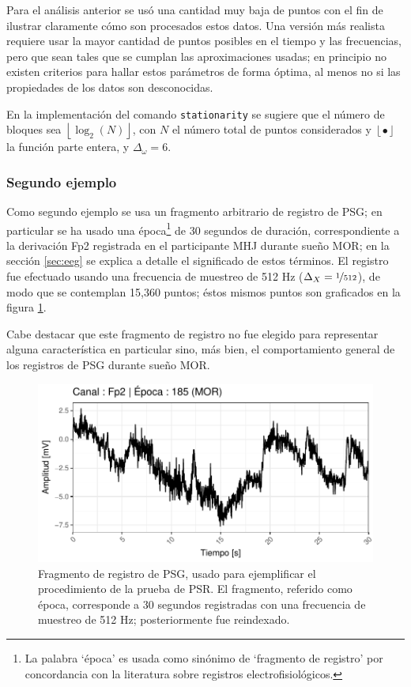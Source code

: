 \documentclass[12pt,letterpaper]{book}
\newcommand{\entero}[1]{\left\lfloor #1 \right\rfloor}
\begin{document}
Para el análisis anterior se usó una cantidad muy baja de puntos con el fin de ilustrar claramente cómo son procesados estos datos.
%
Una versión más realista requiere usar la mayor cantidad de puntos posibles en el tiempo y las frecuencias, pero que sean tales que se cumplan las aproximaciones usadas; en principio no existen criterios para hallar estos parámetros de forma óptima, al menos no si las propiedades de los datos son desconocidas.

En la implementación del comando \texttt{stationarity} se sugiere que el número de bloques sea $\entero{\log_2(N)}$, con $N$ el número total de puntos considerados y $\entero{\bullet}$ la función parte entera, y $\Delta_\omega=6$.


\subsubsection*{Segundo ejemplo}

Como segundo ejemplo se usa un fragmento arbitrario de registro de PSG; en particular se ha usado una época\footnote{La palabra `época' es usada como sinónimo de `fragmento de registro' por concordancia con la literatura sobre registros electrofisiológicos.} de 30 segundos de duración, correspondiente a la derivación Fp2 registrada en el participante MHJ durante sueño MOR; en la sección \ref{sec:eeg} se explica a detalle el significado de estos términos.
%
El registro fue efectuado usando una frecuencia de muestreo de 512 Hz ($\Delta_X =\nicefrac{1}{512}$), de modo que se contemplan 15,360 puntos; éstos mismos puntos son graficados en la figura \ref{fig:lazy22}.

Cabe destacar que este fragmento de registro no fue elegido para representar alguna característica en particular sino, más bien, el comportamiento general de los registros de PSG durante sueño MOR.

\begin{figure}
\centering
\includegraphics[width=.9\linewidth]{./scripts_graf_res/psg.pdf}
\caption[Fragmento de registro de PSG, usado para ejemplificar la prueba de Priestey-Subba Rao]{Fragmento de registro de PSG, usado para ejemplificar el procedimiento de la prueba de PSR.
%
El fragmento, referido como época, corresponde a 30 segundos registradas con una frecuencia de muestreo de 512 Hz; posteriormente fue reindexado.}
\label{fig:lazy22}
\end{figure}
\end{document}
